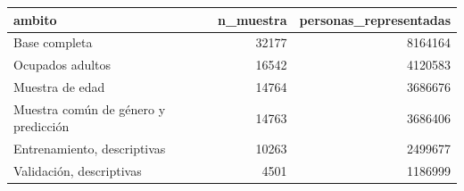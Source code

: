 \begin{tabular}{lrr}
\toprule
ambito & n\_muestra & personas\_representadas \\
\midrule
Base completa & 32177 & 8164164 \\
Ocupados adultos & 16542 & 4120583 \\
Muestra de edad & 14764 & 3686676 \\
Muestra común de género y predicción & 14763 & 3686406 \\
Entrenamiento, descriptivas & 10263 & 2499677 \\
Validación, descriptivas & 4501 & 1186999 \\
\bottomrule
\end{tabular}
